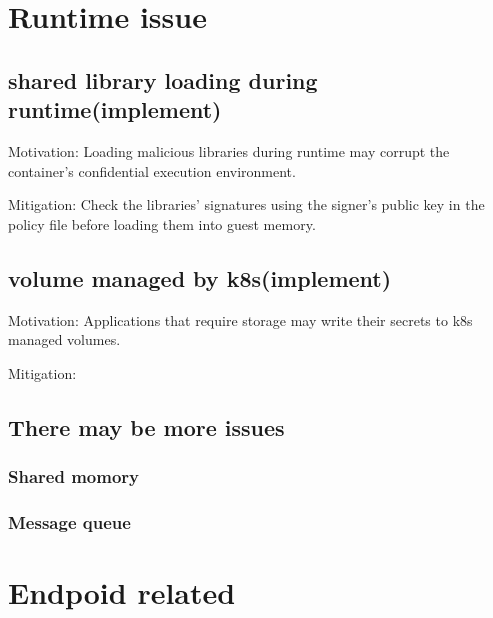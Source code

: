 \section{Runtime issue}
\subsection{shared library loading during runtime(implement)}
Motivation: Loading malicious libraries during runtime may corrupt the container's confidential execution environment.

Mitigation: Check the libraries' signatures using the signer's public key in the policy file before loading them into guest memory.


\subsection{volume managed by k8s(implement)}
Motivation: Applications that require storage may write their secrets to k8s managed volumes.

Mitigation: 


\subsection{There may be more issues}
\subsubsection{Shared momory}
\subsubsection{Message queue}

\section{Endpoid related}
